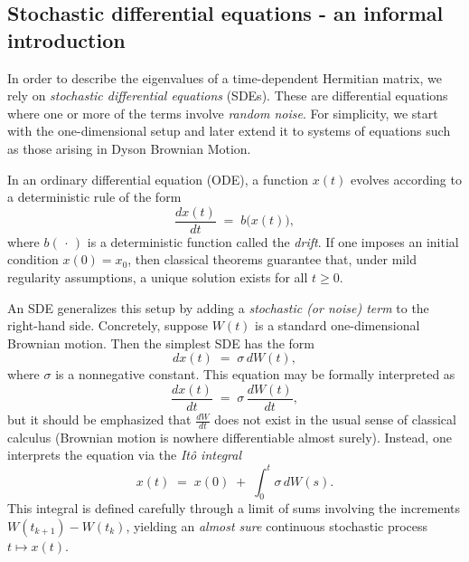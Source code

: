 \documentclass[letterpaper,11pt,oneside,reqno]{article}
\numberwithin{equation}{section}
\theoremstyle{definition}
\begin{document}
\subsection{Stochastic differential equations - an informal introduction}

In order to describe the eigenvalues of a time-dependent Hermitian matrix, we rely on \emph{stochastic differential equations} (SDEs). These are differential equations where one or more of the terms involve \emph{random noise}. For simplicity, we start with the one-dimensional setup and later extend it to systems of equations such as those arising in Dyson Brownian Motion.

In an ordinary differential equation (ODE), a function \(x(t)\) evolves according to a deterministic rule of the form
\[
\frac{dx(t)}{dt} \;=\; b\bigl(x(t)\bigr),
\]
where \(b(\,\cdot\,)\) is a deterministic function called the \emph{drift}. If one imposes an initial condition \(x(0)=x_0\), then classical theorems guarantee that, under mild regularity assumptions, a unique solution exists for all \(t\ge0\).

An SDE generalizes this setup by adding a \emph{stochastic (or noise) term} to the right-hand side. Concretely, suppose \(W(t)\) is a standard one-dimensional Brownian motion. Then the simplest SDE has the form
\[
dx(t) \;=\; \sigma\, dW(t),
\]
where \(\sigma\) is a nonnegative constant. This equation may be formally interpreted as
\[
\frac{dx(t)}{dt} \;=\; \sigma\,\frac{dW(t)}{dt},
\]
but it should be emphasized that \(\tfrac{dW}{dt}\) does not exist in the usual sense of classical calculus (Brownian motion is nowhere differentiable almost surely). Instead, one interprets the equation via the \emph{Itô integral}
\[
x(t) \;=\; x(0)\;+\;\int_0^t \sigma\, dW(s).
\]
This integral is defined carefully through a limit of sums involving the increments \(W(t_{k+1})-W(t_k)\), yielding an \emph{almost sure} continuous stochastic process \(t\mapsto x(t)\).
\end{document}
